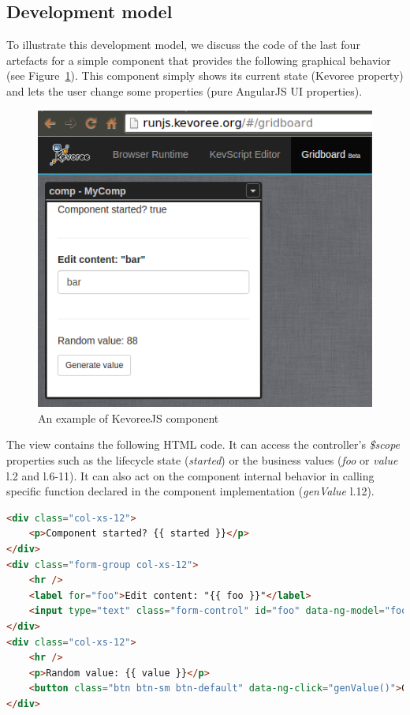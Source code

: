 \subsection{Development model}
To illustrate this development model, we discuss the code of the last four artefacts for a simple component that provides the following graphical behavior (see Figure~\ref{fig:fig5}). This component simply shows its current state (Kevoree property) and lets the user change some properties (pure AngularJS UI properties).


\begin{figure}[h]
	\centering
	\includegraphics[width=0.8\linewidth]{figures/fig5}
	\caption{An example of KevoreeJS component}
	\label{fig:fig5}
\end{figure}

The view contains the following HTML code. It can access the controller's \emph{\$scope} properties such as the lifecycle state (\emph{started}) or the business values (\emph{foo} or \emph{value} l.2 and l.6-11). It can also act on the component internal behavior in calling specific function declared in the component implementation (\emph{genValue} l.12).

\begin{lstlisting}[language=HTML,numbers=right,firstnumber=last,frame=none,caption={Excerpt of the component view}]
<div class="col-xs-12">
	<p>Component started? {{ started }}</p>
</div>
<div class="form-group col-xs-12">
	<hr />
	<label for="foo">Edit content: "{{ foo }}"</label>
	<input type="text" class="form-control" id="foo" data-ng-model="foo">
</div>
<div class="col-xs-12">
	<hr />
	<p>Random value: {{ value }}</p>
	<button class="btn btn-sm btn-default" data-ng-click="genValue()">Generate value</button>
</div>
\end{lstlisting}


